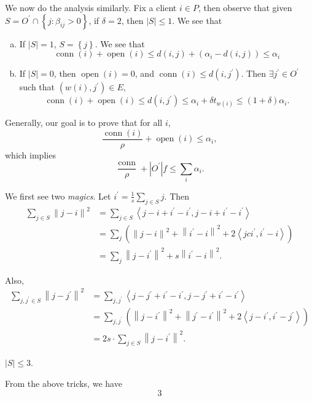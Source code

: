 We now do the analysis similarly. Fix a client \(i\in P\), then observe that given \(S = O^\prime \cap \left\{ j\colon \beta _{ij} > 0 \right\}\), if \(\delta = 2\), then \(\left\vert S \right\vert \leq 1\). We see that
\begin{enumerate}[(a)]
	\item If \(\left\vert S \right\vert = 1\), \(S = \left\{ j \right\} \). We see that
	      \[
		      \mathop{\mathrm{conn}}(i) + \mathop{\mathrm{open}}(i) \leq d(i, j) + (\alpha _i - d(i, j)) \leq \alpha _i
	      \]
	\item If \(\left\vert S \right\vert = 0\), then \(\mathop{\mathrm{open}}(i) = 0\), and \(\mathop{\mathrm{conn}}(i) \leq d(i, j^\prime )\). Then \(\exists j^\prime \in O^\prime \) such that \((w(i), j^\prime )\in E\),
	      \[
		      \mathop{\mathrm{conn}}(i) + \mathop{\mathrm{open}}(i) \leq d(i, j^\prime )\leq \alpha _i + \delta t_{w(i)} \leq (1 + \delta )\alpha _i.
	      \]
\end{enumerate}

Generally, our goal is to prove that for all \(i\),
\begin{equation}
	\frac{\mathop{\mathrm{conn}}(i)}{\rho} + \mathop{\mathrm{open}}(i) \leq \alpha _i,
\end{equation}
which implies
\[
	\frac{\mathop{\mathrm{conn}}}{\rho } + \left\vert O^\prime  \right\vert f \leq \sum_{i} \alpha _i.
\]

We first see two \emph{magics}. Let \(i^\prime = \frac{1}{s}\sum_{j\in S} j\). Then
\[
	\begin{split}
		\sum_{j\in S} \left\lVert j - i\right\rVert ^{2}
		&= \sum_{j\in S} \left\langle j - i + i^\prime - i^\prime , j - i + i^\prime - i^\prime  \right\rangle \\
		&= \sum_{j} \left( \left\lVert j - i\right\rVert ^{2} + \left\lVert i^\prime - i\right\rVert ^{2} + 2\left\langle j c i^\prime , i^\prime - i \right\rangle  \right) \\
		&= \sum_{j} \left\lVert j - i^\prime \right\rVert ^{2} + s \left\lVert i^\prime - i\right\rVert ^{2} .
	\end{split}
\]

Also,
\[
	\begin{split}
		\sum_{j, j^\prime \in S} \left\lVert j - j^\prime \right\rVert ^{2}
		&= \sum_{j, j^\prime }\left\langle j- j^\prime + i^\prime - i^\prime , j- j^\prime + i^\prime - i^\prime  \right\rangle  \\
		&= \sum_{j, j^\prime } \left( \left\lVert j - i^\prime \right\rVert^{2} + \left\lVert j^\prime - i^\prime \right\rVert ^{2} + 2 \left\langle j -i^\prime , i^\prime - j^\prime  \right\rangle   \right) \\
		&= 2s\cdot \sum_{j\in S} \left\lVert j - i^\prime \right\rVert ^{2} .
	\end{split}
\]

\begin{claim}
	\(\left\vert S \right\vert \leq 3\).
\end{claim}
\begin{explanation}
	From the above tricks, we have
	\[
		3
	\]
\end{explanation}